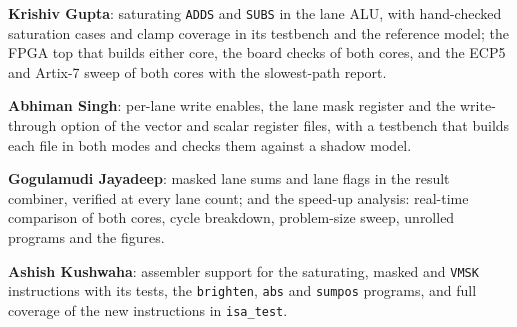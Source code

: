 \textbf{Krishiv Gupta}: saturating \texttt{ADDS} and \texttt{SUBS} in the lane ALU, with
hand-checked saturation cases and clamp coverage in its testbench and the reference
model; the FPGA top that builds either core, the board checks of both cores, and the
ECP5 and Artix-7 sweep of both cores with the slowest-path report.

\textbf{Abhiman Singh}: per-lane write enables, the lane mask register and the
write-through option of the vector and scalar register files, with a testbench that
builds each file in both modes and checks them against a shadow model.

\textbf{Gogulamudi Jayadeep}: masked lane sums and lane flags in the result combiner,
verified at every lane count; and the speed-up analysis: real-time comparison of both
cores, cycle breakdown, problem-size sweep, unrolled programs and the figures.

\textbf{Ashish Kushwaha}: assembler support for the saturating, masked and
\texttt{VMSK} instructions with its tests, the \texttt{brighten}, \texttt{abs} and
\texttt{sumpos} programs, and full coverage of the new instructions in
\texttt{isa\_test}.
